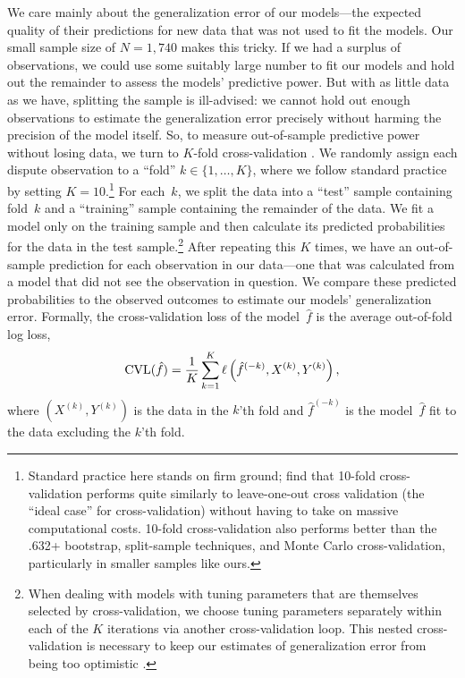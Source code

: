 We care mainly about the generalization error of our models---the expected quality of their predictions for new data that was not used to fit the models.
Our small sample size of $N = 1{,}740$ makes this tricky.
If we had a surplus of observations, we could use some suitably large number to fit our models and hold out the remainder to assess the models' predictive power.
But with as little data as we have, splitting the sample is ill-advised: we cannot hold out enough observations to estimate the generalization error precisely without harming the precision of the model itself.
So, to measure out-of-sample predictive power without losing data, we turn to $K$-fold cross-validation \citep[241--249]{Hastie:2009wpa}.
We randomly assign each dispute observation to a ``fold'' $k \in \{1, \ldots, K\}$, where we follow standard practice by setting $K = 10$.\footnote{Standard practice here stands on firm ground; \citet{molinaro2005} find that 10-fold cross-validation performs quite similarly to leave-one-out cross validation (the ``ideal case'' for cross-validation) without having to take on massive computational costs.  10-fold cross-validation also performs better than the .632+ bootstrap, split-sample techniques, and Monte Carlo cross-validation, particularly in smaller samples like ours.}
For each~$k$, we split the data into a ``test'' sample containing fold~$k$ and a ``training'' sample containing the remainder of the data.
We fit a model only on the training sample and then calculate its predicted probabilities for the data in the test sample.\footnote{%
  \label{fn:nested-cv}
  When dealing with models with tuning parameters that are themselves selected by cross-validation, we choose tuning parameters separately within each of the $K$ iterations via another cross-validation loop.
  This nested cross-validation is necessary to keep our estimates of generalization error from being too optimistic \citep{Varma:2006ch}.
}
After repeating this $K$ times, we have an out-of-sample prediction for each observation in our data---one that was calculated from a model that did not see the observation in question.
We compare these predicted probabilities to the observed outcomes to estimate our models' generalization error.
Formally, the cross-validation loss of the model~$\hat{f}$ is the average out-of-fold log loss,
\begin{equation}
  \label{eq:cv-loss}
  \operatorname{CVL}(\hat{f})
  =
  \frac{1}{K} \sum_{k=1}^K \ell \left(
    \hat{f}^{(-k)}, X^{(k)}, Y^{(k)}
  \right),
\end{equation}
where $(X^{(k)}, Y^{(k)})$ is the data in the $k$'th fold and $\hat{f}^{(-k)}$ is the model~$\hat{f}$ fit to the data excluding the $k$'th fold.

